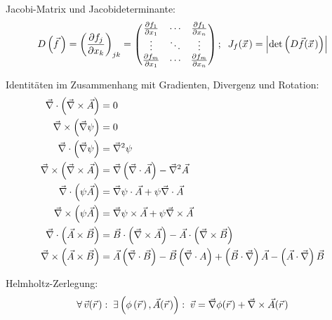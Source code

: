 \documentclass[11pt]{article}
\numberwithin{equation}{section}
\begin{document}
				\noindent
				Jacobi-Matrix und Jacobideterminante:
				\begin{equation}
					D\left(\vec{f}\,\right) = \left(\frac{\partial f_j}{\partial x_k}\right)_{jk}
					= \left(\begin{matrix}
					\frac{\partial f_1}{\partial x_1} & \dotsb & \frac{\partial f_1}{\partial x_n} \\
					\vdots & \ddots & \vdots \\
					\frac{\partial f_m}{\partial x_1} & \dotsb & \frac{\partial f_m}{\partial x_n} \\
					\end{matrix}\right);\;\;J_f(\pvec{x})=\left|\det\left(D\vec{f}(\pvec{x})\right)\right|
				\end{equation}

				\noindent
				Identitäten im Zusammenhang mit Gradienten, Divergenz und Rotation:
				\begin{equation}
					\begin{aligned}
						\vec{\nabla}\cdot\left(\vec{\nabla}\times\vec{A}\right) &= 0 \\
						\vec{\nabla}\times\left(\vec{\nabla}\psi\right) &= 0 \\
						\vec{\nabla}\cdot\left(\vec{\nabla}\psi\right) &= \vec{\nabla}^2\psi \\
						\vec{\nabla}\times\left(\vec{\nabla}\times\vec{A}\right) &= \vec{\nabla}\left(\vec{\nabla}\cdot\vec{A}\right) -\vec{\nabla}^2\vec{A} \\
						\vec{\nabla}\cdot\left(\psi\vec{A}\right) &= \vec{\nabla}\psi\cdot\vec{A} + \psi\vec{\nabla}\cdot\vec{A}\\
						\vec{\nabla}\times\left(\psi\vec{A}\right) &= \vec{\nabla}\psi\times\vec{A} + \psi\vec{\nabla}\times\vec{A} \\
						\vec{\nabla}\cdot\left(\vec{A}\times\vec{B}\right) &= \vec{B}\cdot\left(\vec{\nabla}\times\vec{A}\right) - 	\vec{A}\cdot\left(\vec{\nabla}\times\vec{B}\right) \\
						\vec{\nabla}\times\left(\vec{A}\times\vec{B}\right) &= \vec{A}\left(\vec{\nabla}\cdot\vec{B}\right) - \vec{B}\left(\vec{\nabla}\cdot{A}\right) + \left(\vec{B}\cdot\vec{\nabla}\right)\vec{A} - \left(\vec{A}\cdot\vec{\nabla}\right)\vec{B} \\
					\end{aligned}
				\end{equation}

				\noindent
				Helmholtz-Zerlegung:
				\begin{equation}
					\forall \,\vec{v}(\pvec{r}):\; \exists\left(\phi\left(\pvec{r}\right),\vec{A}(\pvec{r})\right):\;\vec{v} = \Nabla\phi(\pvec{r}) + 	\Nabla\times\vec{A}(\pvec{r})
				\end{equation}
\end{document}
